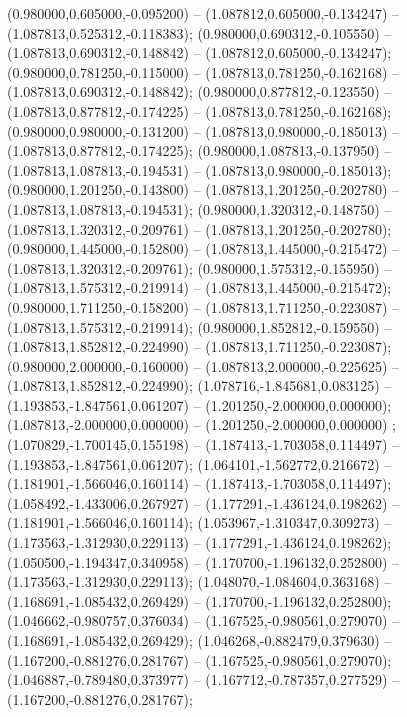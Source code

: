  (0.980000,0.605000,-0.095200) -- (1.087812,0.605000,-0.134247) -- (1.087813,0.525312,-0.118383);
 (0.980000,0.690312,-0.105550) -- (1.087813,0.690312,-0.148842) -- (1.087812,0.605000,-0.134247);
 (0.980000,0.781250,-0.115000) -- (1.087813,0.781250,-0.162168) -- (1.087813,0.690312,-0.148842);
 (0.980000,0.877812,-0.123550) -- (1.087813,0.877812,-0.174225) -- (1.087813,0.781250,-0.162168);
 (0.980000,0.980000,-0.131200) -- (1.087813,0.980000,-0.185013) -- (1.087813,0.877812,-0.174225);
 (0.980000,1.087813,-0.137950) -- (1.087813,1.087813,-0.194531) -- (1.087813,0.980000,-0.185013);
 (0.980000,1.201250,-0.143800) -- (1.087813,1.201250,-0.202780) -- (1.087813,1.087813,-0.194531);
 (0.980000,1.320312,-0.148750) -- (1.087813,1.320312,-0.209761) -- (1.087813,1.201250,-0.202780);
 (0.980000,1.445000,-0.152800) -- (1.087813,1.445000,-0.215472) -- (1.087813,1.320312,-0.209761);
 (0.980000,1.575312,-0.155950) -- (1.087813,1.575312,-0.219914) -- (1.087813,1.445000,-0.215472);
 (0.980000,1.711250,-0.158200) -- (1.087813,1.711250,-0.223087) -- (1.087813,1.575312,-0.219914);
 (0.980000,1.852812,-0.159550) -- (1.087813,1.852812,-0.224990) -- (1.087813,1.711250,-0.223087);
 (0.980000,2.000000,-0.160000) -- (1.087813,2.000000,-0.225625) -- (1.087813,1.852812,-0.224990);
 (1.078716,-1.845681,0.083125) -- (1.193853,-1.847561,0.061207) -- (1.201250,-2.000000,0.000000);
 (1.087813,-2.000000,0.000000) -- (1.201250,-2.000000,0.000000) ;
 (1.070829,-1.700145,0.155198) -- (1.187413,-1.703058,0.114497) -- (1.193853,-1.847561,0.061207);
 (1.064101,-1.562772,0.216672) -- (1.181901,-1.566046,0.160114) -- (1.187413,-1.703058,0.114497);
 (1.058492,-1.433006,0.267927) -- (1.177291,-1.436124,0.198262) -- (1.181901,-1.566046,0.160114);
 (1.053967,-1.310347,0.309273) -- (1.173563,-1.312930,0.229113) -- (1.177291,-1.436124,0.198262);
 (1.050500,-1.194347,0.340958) -- (1.170700,-1.196132,0.252800) -- (1.173563,-1.312930,0.229113);
 (1.048070,-1.084604,0.363168) -- (1.168691,-1.085432,0.269429) -- (1.170700,-1.196132,0.252800);
 (1.046662,-0.980757,0.376034) -- (1.167525,-0.980561,0.279070) -- (1.168691,-1.085432,0.269429);
 (1.046268,-0.882479,0.379630) -- (1.167200,-0.881276,0.281767) -- (1.167525,-0.980561,0.279070);
 (1.046887,-0.789480,0.373977) -- (1.167712,-0.787357,0.277529) -- (1.167200,-0.881276,0.281767);
